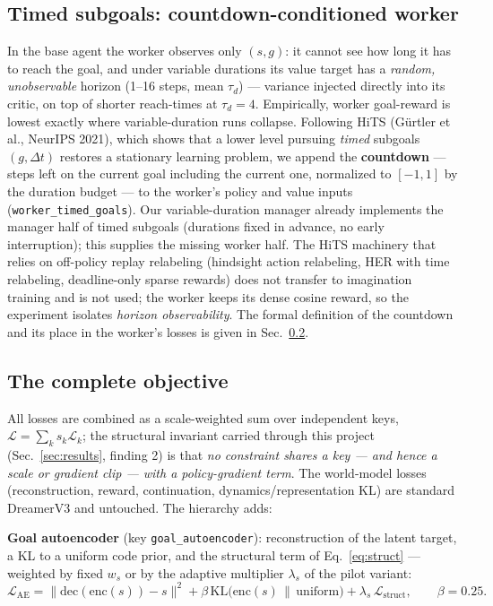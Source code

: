 \documentclass[10pt]{article}
\begin{document}
\subsection{Timed subgoals: countdown-conditioned worker}
\label{sec:timed}
In the base agent the worker observes only $(s, g)$: it cannot see how long it
has to reach the goal, and under variable durations its value target has a
\emph{random, unobservable} horizon (1--16 steps, mean $\tau_d$) --- variance
injected directly into its critic, on top of shorter reach-times at
$\tau_d{=}4$. Empirically, worker goal-reward is lowest exactly where
variable-duration runs collapse. Following HiTS (G\"urtler et al., NeurIPS
2021), which shows that a lower level pursuing \emph{timed} subgoals
$(g, \Delta t)$ restores a stationary learning problem, we append the
\textbf{countdown} --- steps left on the current goal including the current
one, normalized to $[-1,1]$ by the duration budget --- to the worker's policy
and value inputs (\texttt{worker\_timed\_goals}). Our variable-duration manager
already implements the manager half of timed subgoals (durations fixed in
advance, no early interruption); this supplies the missing worker half. The
HiTS machinery that relies on off-policy replay relabeling (hindsight action
relabeling, HER with time relabeling, deadline-only sparse rewards) does not
transfer to imagination training and is not used; the worker keeps its dense
cosine reward, so the experiment isolates \emph{horizon observability}.
The formal definition of the countdown and its place in the worker's losses
is given in Sec.~\ref{sec:objective}.

\subsection{The complete objective}
\label{sec:objective}

All losses are combined as a scale-weighted sum over independent keys,
$\mathcal{L} = \sum_k s_k \mathcal{L}_k$; the structural invariant carried
through this project (Sec.~\ref{sec:results}, finding 2) is that \emph{no
constraint shares a key --- and hence a scale or gradient clip --- with a
policy-gradient term}. The world-model losses (reconstruction, reward,
continuation, dynamics/representation KL) are standard DreamerV3 and
untouched. The hierarchy adds:

\textbf{Goal autoencoder} (key \texttt{goal\_autoencoder}): reconstruction
of the latent target, a KL to a uniform code prior, and the structural term
of Eq.~\eqref{eq:struct} --- weighted by fixed $w_s$ or by the adaptive
multiplier $\lambda_s$ of the pilot variant:
\begin{equation}
\mathcal{L}_{\text{AE}} = \big\|\mathrm{dec}(\mathrm{enc}(s)) - s\big\|^2
+ \beta\,\mathrm{KL}\!\big(\mathrm{enc}(s)\,\|\,\mathrm{uniform}\big)
+ \lambda_s\,\mathcal{L}_{\text{struct}}, \qquad \beta = 0.25 .
\label{eq:ae}
\end{equation}
\end{document}
